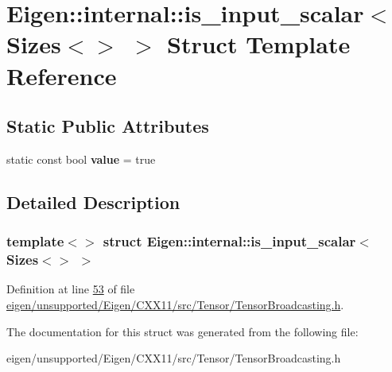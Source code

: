 \hypertarget{struct_eigen_1_1internal_1_1is__input__scalar_3_01_sizes_3_4_01_4}{}\section{Eigen\+:\+:internal\+:\+:is\+\_\+input\+\_\+scalar$<$ Sizes$<$$>$ $>$ Struct Template Reference}
\label{struct_eigen_1_1internal_1_1is__input__scalar_3_01_sizes_3_4_01_4}
\subsection*{Static Public Attributes}
\begin{DoxyCompactItemize}
\item 
\mbox{\label{struct_eigen_1_1internal_1_1is__input__scalar_3_01_sizes_3_4_01_4_acdf973492bbaec6462780a6dd0ef6540}} 
static const bool {\bfseries value} = true
\end{DoxyCompactItemize}


\subsection{Detailed Description}
\subsubsection*{template$<$$>$\newline
struct Eigen\+::internal\+::is\+\_\+input\+\_\+scalar$<$ Sizes$<$$>$ $>$}



Definition at line \hyperlink{eigen_2unsupported_2_eigen_2_c_x_x11_2src_2_tensor_2_tensor_broadcasting_8h_source_l00053}{53} of file \hyperlink{eigen_2unsupported_2_eigen_2_c_x_x11_2src_2_tensor_2_tensor_broadcasting_8h_source}{eigen/unsupported/\+Eigen/\+C\+X\+X11/src/\+Tensor/\+Tensor\+Broadcasting.\+h}.



The documentation for this struct was generated from the following file\+:\begin{DoxyCompactItemize}
\item 
eigen/unsupported/\+Eigen/\+C\+X\+X11/src/\+Tensor/\+Tensor\+Broadcasting.\+h\end{DoxyCompactItemize}
